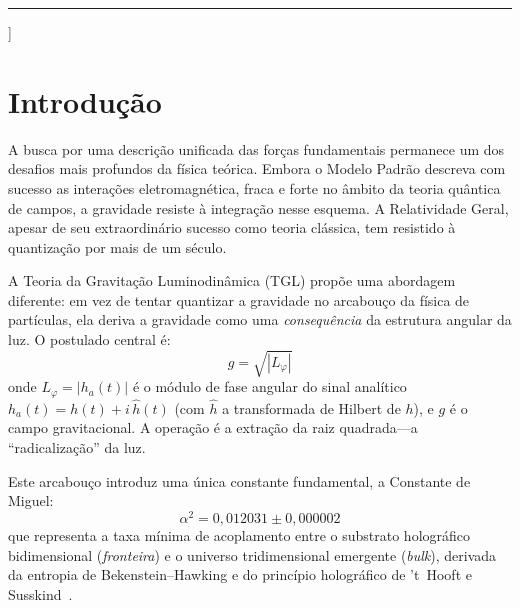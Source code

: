 \documentclass[12pt,a4paper,twocolumn]{article}
\newcommand{\alphaii}{\alpha^{2}}
\newcommand{\boundary}{\textit{fronteira}}
\newcommand{\bulk}{\textit{bulk}}
\begin{document}
\begin{@twocolumnfalse}
\begin{abstract}
\medskip
\noindent\textbf{Palavras-chave:} ondas gravitacionais, ecos gravitacionais, princípio holográfico, anti-tautologia, piso de Hilbert, hierarquia fractal, TGL, Constante de Miguel.
    \end{abstract}
    \vspace{0.5em}
    \rule{\textwidth}{0.4pt}
    \vspace{0.5em}
  \end{@twocolumnfalse}
]


\section{Introdução}
\label{sec:introduction}

A busca por uma descrição unificada das forças fundamentais permanece um dos desafios mais profundos da física teórica. Embora o Modelo Padrão descreva com sucesso as interações eletromagnética, fraca e forte no âmbito da teoria quântica de campos, a gravidade resiste à integração nesse esquema. A Relatividade Geral, apesar de seu extraordinário sucesso como teoria clássica, tem resistido à quantização por mais de um século.

A Teoria da Gravitação Luminodinâmica (TGL) propõe uma abordagem diferente: em vez de tentar quantizar a gravidade no arcabouço da física de partículas, ela deriva a gravidade como uma \emph{consequência} da estrutura angular da luz. O postulado central é:
\begin{equation}
\label{eq:radical}
g = \sqrt{|L_\varphi|}
\end{equation}
onde $L_\varphi = |h_a(t)|$ é o módulo de fase angular do sinal analítico $h_a(t) = h(t) + i\,\hat{h}(t)$ (com $\hat{h}$ a transformada de Hilbert de $h$), e $g$ é o campo gravitacional. A operação é a extração da raiz quadrada---a ``radicalização'' da luz.

Este arcabouço introduz uma única constante fundamental, a Constante de Miguel:
\begin{equation}
\label{eq:alpha2}
\alphaii = 0{,}012031 \pm 0{,}000002
\end{equation}
que representa a taxa mínima de acoplamento entre o substrato holográfico bidimensional (\boundary) e o universo tridimensional emergente (\bulk), derivada da entropia de Bekenstein--Hawking e do princípio holográfico de 't~Hooft e Susskind~\cite{tHooft1993,Susskind1995,Bekenstein1973}.
\end{document}
